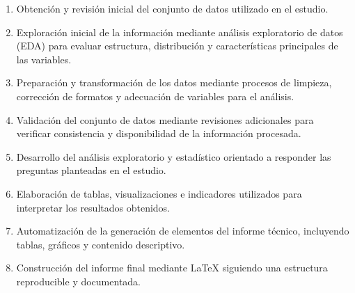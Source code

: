 \begin{enumerate}

\item Obtención y revisión inicial del conjunto de datos utilizado en el estudio.

\item Exploración inicial de la información mediante análisis exploratorio de datos (EDA) para evaluar estructura, distribución y características principales de las variables.

\item Preparación y transformación de los datos mediante procesos de limpieza, corrección de formatos y adecuación de variables para el análisis.

\item Validación del conjunto de datos mediante revisiones adicionales para verificar consistencia y disponibilidad de la información procesada.

\item Desarrollo del análisis exploratorio y estadístico orientado a responder las preguntas planteadas en el estudio.

\item Elaboración de tablas, visualizaciones e indicadores utilizados para interpretar los resultados obtenidos.

\item Automatización de la generación de elementos del informe técnico, incluyendo tablas, gráficos y contenido descriptivo.

\item Construcción del informe final mediante \LaTeX{} siguiendo una estructura reproducible y documentada.

\end{enumerate}